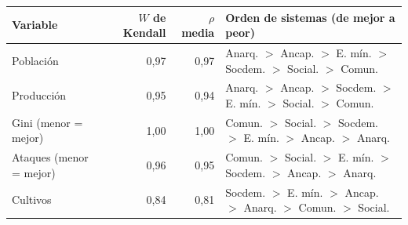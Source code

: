 \begin{tabular}{lrrp{6.2cm}}
\toprule
Variable & $W$ de Kendall & $\rho$ media & Orden de sistemas (de mejor a peor) \\
\midrule
Población & 0,97 & 0,97 & Anarq. $>$ Ancap. $>$ E. mín. $>$ Socdem. $>$ Social. $>$ Comun. \\
Producción & 0,95 & 0,94 & Anarq. $>$ Ancap. $>$ Socdem. $>$ E. mín. $>$ Social. $>$ Comun. \\
Gini (menor = mejor) & 1,00 & 1,00 & Comun. $>$ Social. $>$ Socdem. $>$ E. mín. $>$ Ancap. $>$ Anarq. \\
Ataques (menor = mejor) & 0,96 & 0,95 & Comun. $>$ Social. $>$ E. mín. $>$ Socdem. $>$ Ancap. $>$ Anarq. \\
Cultivos & 0,84 & 0,81 & Socdem. $>$ E. mín. $>$ Ancap. $>$ Anarq. $>$ Comun. $>$ Social. \\
\bottomrule
\end{tabular}
